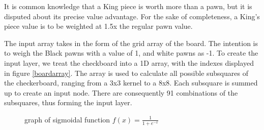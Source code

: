 \documentclass[12pt,a4paper]{article}
\begin{document}
    It is common knowledge that a King piece is worth more than a pawn, but it is disputed about its precise value advantage. For the sake of completeness, a King's piece value is to be weighted at 1.5x the regular pawn value. 

    The input array takes in the form of the grid array of the board. The intention is to weigh the Black pawns with a value of 1, and white pawns as -1. To create the input layer, we treat the checkboard into a 1D array, with the indexes displayed in figure \ref{boardarray}. The array is used to calculate all possible subsquares of the checkerboard, ranging from a 3x3 kernel to a 8x8. Each subsquare is summed up to create an input node. There are consequently 91 combinations of the subsquares, thus forming the input layer. 
    
    \begin{figure}
        \centering
        \vspace{-30pt}
        \caption{graph of sigmoidal function $f(x)=\frac{1}{1+e^{-x}}$ \label{sigmoid}}
        \vspace{-30pt}
    \end{figure}
    
\end{document}
